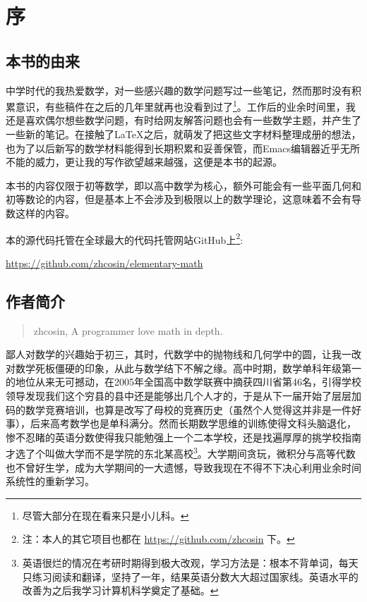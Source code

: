 
\chapter*{序}


\section{本书的由来}

中学时代的我热爱数学，对一些感兴趣的数学问题写过一些笔记，然而那时没有积累意识，有些稿件在之后的几年里就再也没看到过了\footnote{尽管大部分在现在看来只是小儿科。}。工作后的业余时间里，我还是喜欢偶尔想些数学问题，有时给网友解答问题也会有一些数学主题，并产生了一些新的笔记。在接触了LaTeX之后，就萌发了把这些文字材料整理成册的想法，也为了以后新写的数学材料能得到长期积累和妥善保管，而Emacs编辑器近乎无所不能的威力，更让我的写作欲望越来越强，这便是本书的起源。

本书的内容仅限于初等数学，即以高中数学为核心，额外可能会有一些平面几何和初等数论的内容，但是基本上不会涉及到极限以上的数学理论，这意味着不会有导数这样的内容。

本的源代码托管在全球最大的代码托管网站GitHub上\footnote{注：本人的其它项目也都在 \href{https://github.com/zhcosin}{https://github.com/zhcosin} 下。}:
\begin{center}
\href{https://github.com/zhcosin/elementary-math}{https://github.com/zhcosin/elementary-math}
\end{center}

\section{作者简介}
\begin{quotation}
zhcosin, A programmer love math in depth.
\end{quotation}

鄙人对数学的兴趣始于初三，其时，代数学中的抛物线和几何学中的圆，让我一改对数学死板僵硬的印象，从此与数学结下不解之缘。高中时期，数学单科年级第一的地位从来无可撼动，在2005年全国高中数学联赛中摘获四川省第46名，引得学校领导发现我们这个穷县的县中还是能够出几个人才的，于是从下一届开始了层层加码的数学竞赛培训，也算是改写了母校的竞赛历史（虽然个人觉得这并非是一件好事），后来高考数学也是单科满分。然而长期数学思维的训练使得文科头脑退化，惨不忍睹的英语分数使得我只能勉强上一个二本学校，还是找遍厚厚的挑学校指南才选了个叫做大学而不是学院的东北某高校\footnote{英语很烂的情况在考研时期得到极大改观，学习方法是：根本不背单词，每天只练习阅读和翻译，坚持了一年，结果英语分数大大超过国家线。英语水平的改善为之后我学习计算机科学奠定了基础。}。大学期间贪玩，微积分与高等代数也不曾好生学，成为大学期间的一大遗憾，导致我现在不得不下决心利用业余时间系统性的重新学习。

